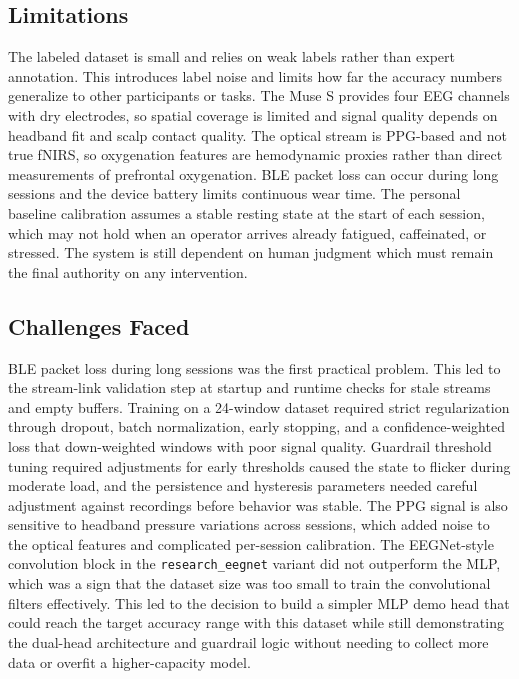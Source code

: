 \documentclass[conference]{IEEEtran}
\begin{document}
\subsection{Limitations}

The labeled dataset is small and relies on weak labels rather than expert annotation. This introduces label noise and limits how far the accuracy numbers generalize to other participants or tasks. The Muse S provides four EEG channels with dry electrodes, so spatial coverage is limited and signal quality depends on headband fit and scalp contact quality. The optical stream is PPG-based and not true fNIRS, so oxygenation features are hemodynamic proxies rather than direct measurements of prefrontal oxygenation. BLE packet loss can occur during long sessions and the device battery limits continuous wear time. The personal baseline calibration assumes a stable resting state at the start of each session, which may not hold when an operator arrives already fatigued, caffeinated, or stressed. The system is still dependent on human judgment which must remain the final authority on any intervention.

\subsection{Challenges Faced}

BLE packet loss during long sessions was the first practical problem. This led to the stream-link validation step at startup and runtime checks for stale streams and empty buffers. Training on a 24-window dataset required strict regularization through dropout, batch normalization, early stopping, and a confidence-weighted loss that down-weighted windows with poor signal quality. Guardrail threshold tuning required adjustments for early thresholds caused the state to flicker during moderate load, and the persistence and hysteresis parameters needed careful adjustment against recordings before behavior was stable. The PPG signal is also sensitive to headband pressure variations across sessions, which added noise to the optical features and complicated per-session calibration. The EEGNet-style convolution block in the \texttt{research\_eegnet} variant did not outperform the MLP, which was a sign that the dataset size was too small to train the convolutional filters effectively. This led to the decision to build a simpler MLP demo head that could reach the target accuracy range with this dataset while still demonstrating the dual-head architecture and guardrail logic without needing to collect more data or overfit a higher-capacity model.
\end{document}
